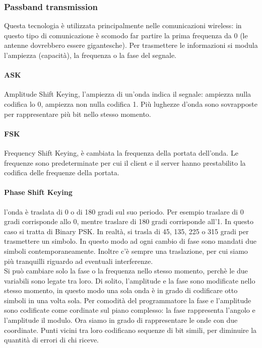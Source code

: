 \documentclass{article}
\begin{document}
\subsubsection{Passband transmission}
Questa tecnologia è utilizzata principalmente nelle comunicazioni wireless: in
questo tipo di comunicazione è scomodo far partire la prima frequenza da 0 (le
antenne dovrebbero essere gigantesche). Per trasmettere le informazioni si
modula l'ampiezza (capacità), la frequenza o la fase del segnale.

\paragraph{ASK} Amplitude Shift Keying, l'ampiezza di un'onda indica il segnale:
ampiezza nulla codifica lo 0, ampiezza non nulla codifica 1. Più lughezze d'onda
sono sovrapposte per rappresentare più bit nello stesso momento.

\paragraph{FSK} Frequency Shift Keying, è cambiata la frequenza della portata
dell'onda. Le frequenze sono predeterminate per cui il client e il server hanno
prestabilito la codifica delle frequenze della portata.

\paragraph{Phase Shift Keying} l'onda è traslata di 0 o di 180 gradi sul suo
periodo. Per esempio traslare di 0 gradi corrisponde allo 0, mentre traslare di
180 gradi corrisponde all'1. In questo caso si tratta di Binary PSK. In realtà,
si trasla di 45, 135, 225 o 315 gradi per trasmettere un simbolo. In questo modo
ad ogni cambio di fase sono mandati due simboli contemporaneamente. Inoltre c'è
sempre una traslazione, per cui siamo più tranquilli riguardo ad eventuali
interferenze.\\

Si può cambiare solo la fase o la frequenza nello stesso momento, perchè le due
variabili sono legate tra loro. Di solito, l'amplitude e la fase sono modificate
nello stesso momento, in questo modo una sola onda è in grado di codificare otto
simboli in una volta sola. Per comodità del programmatore la fase e
l'amplitude sono codificate come cordinate sul piano complesso: la fase
rappresenta l'angolo e l'amplitude il modulo. Ora siamo in grado di
rappresentare le onde con due coordinate. Punti vicini tra loro codificano
sequenze di bit simili, per diminuire la quantità di errori di chi riceve.
\end{document}
